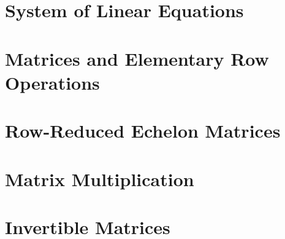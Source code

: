 \section{System of Linear Equations}

\section{Matrices and Elementary Row Operations}

\section{Row-Reduced Echelon Matrices}

\section{Matrix Multiplication}

\section{Invertible Matrices}

